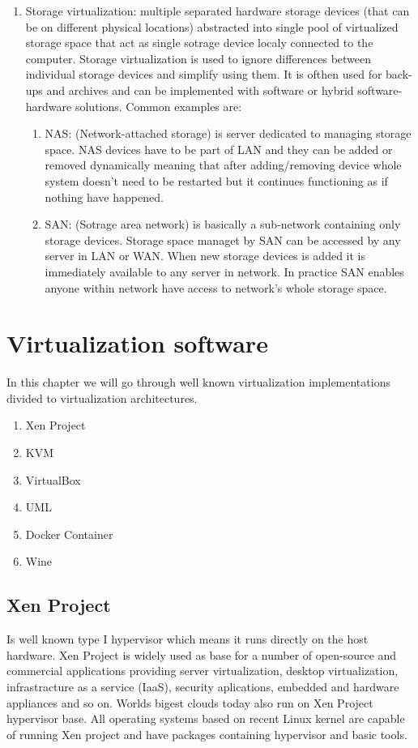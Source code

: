 \begin{itemize}
\begin{enumerate}
\begin{enumerate}
\item Storage virtualization: multiple separated hardware storage devices (that can be on different physical locations) abstracted into single pool of virtualized storage space that act as single sotrage device localy connected to the computer. Storage virtualization is used to ignore differences between individual storage devices and simplify using them. It is ofthen used for back-ups and archives and can be implemented with software or hybrid software-hardware solutions. Common examples are:
\begin{enumerate}
\item NAS: (Network-attached storage) is server dedicated to managing storage space. NAS devices have to be part of LAN and they can be added or removed dynamically meaning that after adding/removing device whole system doesn't need to be restarted but it continues functioning as if nothing have happened.
\item SAN: (Sotrage area network) is basically a sub-network containing only storage devices. Storage space managet by SAN can be accessed by any server in LAN or WAN. When new storage devices is added it is immediately available to any server in network. In practice SAN enables anyone within network have access to network's whole storage space.
\end{enumerate}
\end{enumerate}
\end{enumerate}


\chapter{Virtualization software}
In this chapter we will go through well known virtualization implementations divided to virtualization architectures.
\begin{enumerate}
\item Xen Project
\item KVM
\item VirtualBox
\item UML
\item Docker Container
\item Wine
\end{enumerate}

\section{Xen Project}
Is well known type I hypervisor which means it runs directly on the host hardware. Xen Project is widely used as base for a number of open-source and commercial applications providing server virtualization, desktop virtualization, infrastracture as a service (IaaS), security aplications, embedded and hardware appliances and so on. Worlds bigest clouds today also run on Xen Project hypervisor base. All operating systems based on recent Linux kernel are capable of running Xen project and have packages containing hypervisor and basic tools.


\end{itemize}
